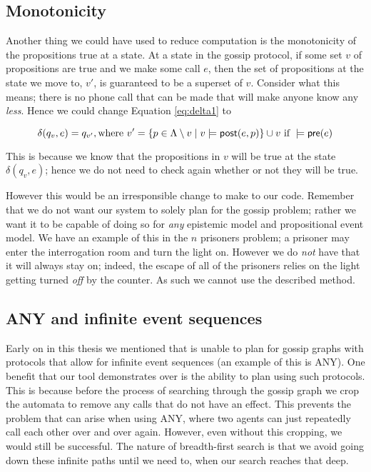 \documentclass[10pt, a4paper]{report}
\begin{document}
\subsection{Monotonicity}
\label{sec:Monotonicity}

Another thing we could have used to reduce computation is the monotonicity of
the propositions true at a state. At a state in the gossip protocol, if some set
$v$ of propositions are true and we make some call $e$, then the set of
propositions at the state we move to, $v'$, is guaranteed to be a superset of
$v$. Consider what this means; there is no phone call that can be made that will
make anyone know any \emph{less}. Hence we could change Equation
\ref{eq:delta1} to

\begin{equation} \label{eq:delta2}
  \delta(q_v, e) = q_{v'}, \text{where } v' = \{p \in \Lambda \setminus v \mid v \models \textsf{post}(e, p)\} \cup v
  \text{ if } 
  \models \textsf{pre}(e)
\end{equation}

This is because we know that the propositions in $v$ will be true at the state
$\delta(q_v, e)$; hence we do not need to check again whether or not they will
be true. 

However this would be an irresponsible change to make to our code. Remember that
we do not want our system to solely plan for the gossip problem; rather we want
it to be capable of doing so for \emph{any} epistemic model and propositional
event model. We have an example of this in the $n$ prisoners problem; a prisoner
may enter the interrogation room and turn the light on. However we do \emph{not}
have that it will always stay on; indeed, the escape of all of the prisoners
relies on the light getting turned \emph{off} by the counter. As such we cannot
use the described method. 

\subsection{\textsf{ANY} and infinite event sequences}

Early on in this thesis we mentioned that \cite{GithubGossip} is unable to plan
for gossip graphs with protocols that allow for infinite event sequences (an
example of this is \textsf{ANY}). One benefit that our tool demonstrates over
\cite{GithubGossip} is the ability to plan using such protocols. This is because
before the process of searching through the gossip graph we crop the automata to
remove any calls that do not have an effect. This prevents the problem that can
arise when using \textsf{ANY}, where two agents can just repeatedly call each
other over and over again. However, even without this cropping, we would still
be successful. The nature of breadth-first search is that we avoid going down
these infinite paths until we need to, when our search reaches that deep. 
\end{document}

